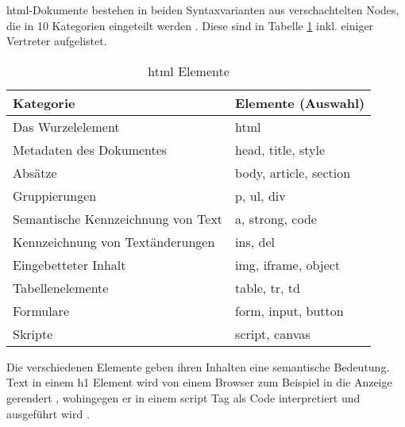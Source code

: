             \gls{html}-Dokumente bestehen in beiden Syntaxvarianten aus verschachtelten
            Nodes, die in 10 Kategorien eingeteilt werden \cite[Kapitel 4]{w3c:html5}.
            Diese sind in Tabelle \ref{table:htmlElements} inkl. einiger Vertreter aufgelistet.

            \begin{table}[h]
                \centering
                \begin{tabular}{|l|l|}
                \hline
                \textbf{Kategorie} & \textbf{Elemente (Auswahl)} \\
                \hline
                Das Wurzelelement & html \\
                \hline
                Metadaten des Dokumentes & head, title, style \\
                \hline
                Absätze & body, article, section \\
                \hline
                Gruppierungen & p, ul, div \\
                \hline
                Semantische Kennzeichnung von Text & a, strong, code \\
                \hline
                Kennzeichnung von Textänderungen & ins, del \\
                \hline
                Eingebetteter Inhalt & img, iframe, object \\
                \hline
                Tabellenelemente & table, tr, td \\
                \hline
                Formulare & form, input, button \\
                \hline
                Skripte & script, canvas \\
                \hline
                \end{tabular}
                \caption{\gls{html} Elemente}
                \label{table:htmlElements}
            \end{table}

            Die verschiedenen Elemente geben ihren Inhalten eine semantische Bedeutung.
            Text in einem h1 Element wird von einem Browser zum Beispiel in die Anzeige gerendert
            \cite[Kapitel 4.3.6]{w3c:html5},
            wohingegen er in einem script Tag als Code interpretiert und ausgeführt wird
            \cite[Kapitel 4.11.1]{w3c:html5}.
            
